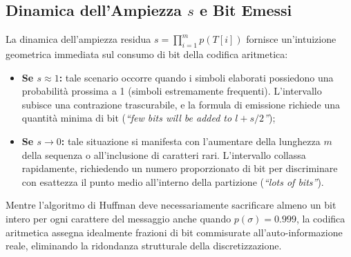 \FloatBarrier
\subsection{Dinamica dell'Ampiezza $s$ e Bit Emessi}
\label{subsec:dinamica-ampiezza-s}

La dinamica dell'ampiezza residua $s = \prod_{i=1}^m p(T[i])$ fornisce un'intuizione geometrica immediata sul consumo di bit della codifica aritmetica:
\begin{itemize}
  \item \textbf{Se $s \approx 1$:} tale scenario occorre quando i simboli elaborati possiedono una probabilit\`a prossima a 1 (simboli estremamente frequenti). L'intervallo subisce una contrazione trascurabile, e la formula di emissione richiede una quantit\`a minima di bit (\textit{``few bits will be added to $l + s/2$''});
  \item \textbf{Se $s \to 0$:} tale situazione si manifesta con l'aumentare della lunghezza $m$ della sequenza o all'inclusione di caratteri rari. L'intervallo collassa rapidamente, richiedendo un numero proporzionato di bit per discriminare con esattezza il punto medio all'interno della partizione (\textit{``lots of bits''}).
\end{itemize}

Mentre l'algoritmo di Huffman deve necessariamente sacrificare almeno un bit intero per ogni carattere del messaggio anche quando $p(\sigma) = 0.999$, la codifica aritmetica assegna idealmente frazioni di bit commisurate all'auto-informazione reale, eliminando la ridondanza strutturale della discretizzazione.
